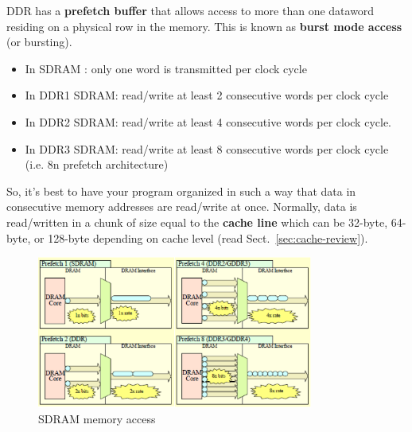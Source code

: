 \begin{framed}
  DDR has a {\bf prefetch buffer} that allows access to more than one
  dataword residing on a physical row in the memory. This is known as
  {\bf burst mode access} (or bursting).
  \begin{itemize}
  \item In SDRAM : only one word is transmitted per clock cycle
  \item In DDR1 SDRAM: read/write at least 2 consecutive words per
    clock cycle
  \item In DDR2 SDRAM: read/write at least 4 consecutive words per
    clock cycle.
  \item In DDR3 SDRAM: read/write at least 8 consecutive words per
    clock cycle (i.e. 8n prefetch architecture)
  \end{itemize}
  So, it's best to have your program organized in such a way that data
  in consecutive memory addresses are read/write at once.
  Normally, data is read/written in a chunk of size equal to the
  {\bf cache line} which can be 32-byte, 64-byte, or 128-byte depending
  on cache level (read Sect.~\ref{sec:cache-review}).
\end{framed}


\begin{figure}[hbt]
  \centerline{\includegraphics[height=5cm,
    angle=0]{./images/DRAM_access.eps}}
  \caption{SDRAM memory access}
  \label{fig:SDRAM}
\end{figure}

